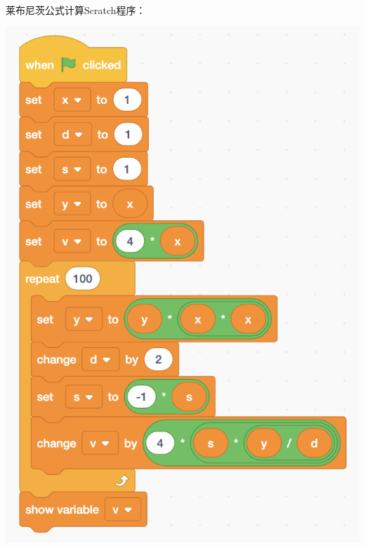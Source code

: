 \documentclass[b5paper]{ctexart}
\begin{document}
\begin{Answer}[ref={ex:reals}]
{莱布尼茨公式计算Scratch程序：
\begin{center}
 \includegraphics[scale=0.4]{img/scratch-leibniz}
 \label{fig:scratch-leibniz}
\end{center}

}
\end{Answer}
\end{document}
